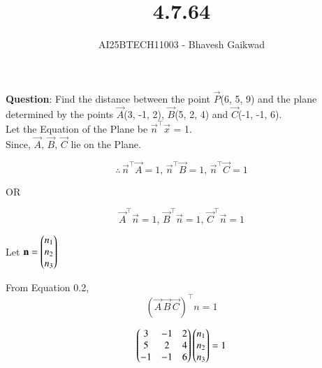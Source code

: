 \documentclass[journal]{IEEEtran}
\begin{document}

\vspace{3cm}

\title{4.7.64}
\author{AI25BTECH11003 - Bhavesh Gaikwad}
{\let\newpage\relax\maketitle}

\renewcommand{\thefigure}{\theenumi}
\renewcommand{\thetable}{\theenumi}
\setlength{\intextsep}{10pt} 


\renewcommand{\thetable}{\theenumi}


\textbf{Question}: Find the distance between the point $\vec{P}$(6, 5, 9) and the plane determined by the points $\vec{A}$(3, -1, 2), $\vec{B}$(5, 2, 4) and $\vec{C}$(-1, -1, 6). \\


\solution
Let the Equation of the Plane be $\vec{n}^\top\vec{x}$ = 1.\\

Since, $\vec{A}, \, \vec{B}, \, \vec{C}$ lie on the Plane.

\begin{equation}
    \therefore \, \vec{n}^\top\vec{A}=1, \, \vec{n}^\top\vec{B}=1,  \, \vec{n}^\top\vec{C}=1
\end{equation}

\begin{center}
    OR
\end{center}

\begin{equation}
    \vec{A}^\top\vec{n}=1, \, \vec{B}^\top\vec{n}=1, \, \vec{C}^\top\vec{n}=1
\end{equation}

Let $\mathbf{n} = \begin{pmatrix}n_1 \\ n_2 \\ n_3\end{pmatrix}$

From Equation 0.2,
\begin{equation}
    (\vec{A} \, \vec{B} \, \vec{C})^\top n=1
\end{equation}

\begin{equation}
\begin{pmatrix}3 & -1 & 2 \\ 5 & 2 & 4\\ -1 & -1 & 6\end{pmatrix}\begin{pmatrix}n_1 \\ n_2 \\ n_3\end{pmatrix} = 1
\end{equation}
\end{document}
